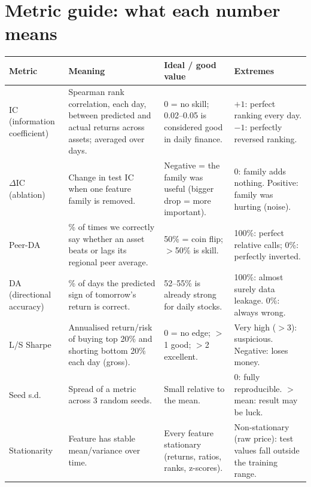 \documentclass[10pt,a4paper]{article}
\begin{document}
\section{Metric guide: what each number means}
\begin{center}\footnotesize
\begin{tabularx}{\linewidth}{@{}p{2.1cm}Xp{3.0cm}X@{}}
\toprule
\textbf{Metric} & \textbf{Meaning} & \textbf{Ideal / good value} & \textbf{Extremes}\\\midrule
IC (information coefficient) & Spearman rank correlation, each day, between predicted and actual returns across assets; averaged over days. & 0 = no skill; 0.02--0.05 is considered good in daily finance. & $+1$: perfect ranking every day. $-1$: perfectly reversed ranking.\\
$\Delta$IC (ablation) & Change in test IC when one feature family is removed. & Negative = the family was useful (bigger drop = more important). & 0: family adds nothing. Positive: family was hurting (noise).\\
Peer-DA & \% of times we correctly say whether an asset beats or lags its regional peer average. & 50\% = coin flip; $>$50\% is skill. & 100\%: perfect relative calls; 0\%: perfectly inverted.\\
DA (directional accuracy) & \% of days the predicted sign of tomorrow's return is correct. & 52--55\% is already strong for daily stocks. & 100\%: almost surely data leakage. 0\%: always wrong.\\
L/S Sharpe & Annualised return/risk of buying top 20\% and shorting bottom 20\% each day (gross). & 0 = no edge; $>$1 good; $>$2 excellent. & Very high ($>$3): suspicious. Negative: loses money.\\
Seed s.d. & Spread of a metric across 3 random seeds. & Small relative to the mean. & 0: fully reproducible. $>$ mean: result may be luck.\\
Stationarity & Feature has stable mean/variance over time. & Every feature stationary (returns, ratios, ranks, z-scores). & Non-stationary (raw price): test values fall outside the training range.\\\bottomrule
\end{tabularx}
\end{center}
\end{document}
